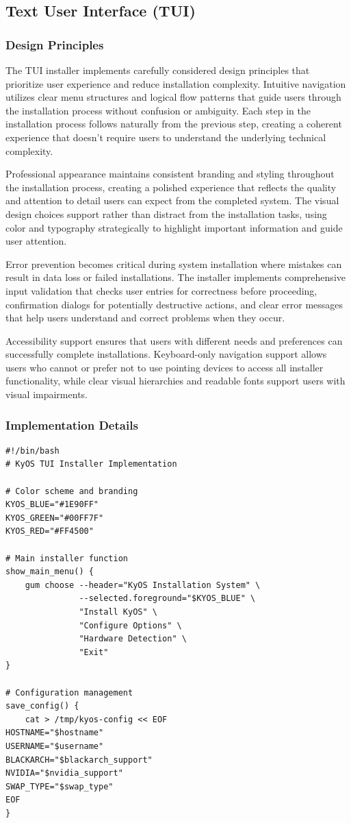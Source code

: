 \documentclass[12pt,a4paper]{article}
\begin{document}
\subsection{Text User Interface (TUI)}

\subsubsection{Design Principles}
The TUI installer implements carefully considered design principles that prioritize user experience and reduce installation complexity. Intuitive navigation utilizes clear menu structures and logical flow patterns that guide users through the installation process without confusion or ambiguity. Each step in the installation process follows naturally from the previous step, creating a coherent experience that doesn't require users to understand the underlying technical complexity.

Professional appearance maintains consistent branding and styling throughout the installation process, creating a polished experience that reflects the quality and attention to detail users can expect from the completed system. The visual design choices support rather than distract from the installation tasks, using color and typography strategically to highlight important information and guide user attention.

Error prevention becomes critical during system installation where mistakes can result in data loss or failed installations. The installer implements comprehensive input validation that checks user entries for correctness before proceeding, confirmation dialogs for potentially destructive actions, and clear error messages that help users understand and correct problems when they occur.

Accessibility support ensures that users with different needs and preferences can successfully complete installations. Keyboard-only navigation support allows users who cannot or prefer not to use pointing devices to access all installer functionality, while clear visual hierarchies and readable fonts support users with visual impairments.

\subsubsection{Implementation Details}
\begin{lstlisting}[caption=TUI Implementation Example]
#!/bin/bash
# KyOS TUI Installer Implementation

# Color scheme and branding
KYOS_BLUE="#1E90FF"
KYOS_GREEN="#00FF7F"
KYOS_RED="#FF4500"

# Main installer function
show_main_menu() {
    gum choose --header="KyOS Installation System" \
               --selected.foreground="$KYOS_BLUE" \
               "Install KyOS" \
               "Configure Options" \
               "Hardware Detection" \
               "Exit"
}

# Configuration management
save_config() {
    cat > /tmp/kyos-config << EOF
HOSTNAME="$hostname"
USERNAME="$username"
BLACKARCH="$blackarch_support"
NVIDIA="$nvidia_support"
SWAP_TYPE="$swap_type"
EOF
}
\end{lstlisting}
\end{document}
